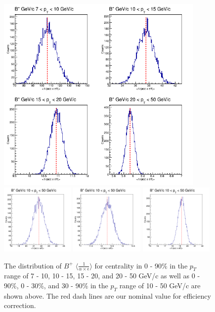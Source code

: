 \begin{figure}[h]
\begin{center}
\includegraphics[width= 0.90\textwidth]{Figures/Chapter5/BPStatSyst_0_90_4BinsPT.png}
\includegraphics[width= 0.32\textwidth]{Figures/Chapter5/BPStatSyst_0_30_1BinsPT.png}
\includegraphics[width= 0.32\textwidth]{Figures/Chapter5/BPStatSyst_30_90_1BinsPT.png}
\includegraphics[width= 0.32\textwidth]{Figures/Chapter5/BPStatSyst_0_90_1BinsPT.png}
\caption{The distribution of $B^+$ $\langle \frac{1}{\alpha \times \epsilon} \rangle$ for centrality in 0 - 90\% in the $p_T$ range of 7 - 10, 10 - 15, 15 - 20, and 20 - 50 GeV/c as well as 0 - 90\%, 0 - 30\%, and 30 - 90\% in the $p_T$ range of 10 - 50 GeV/c are shown above. The red dash lines are our nominal value for efficiency correction.}
\label{BPEffStatSyst}
\end{center}
\end{figure}


